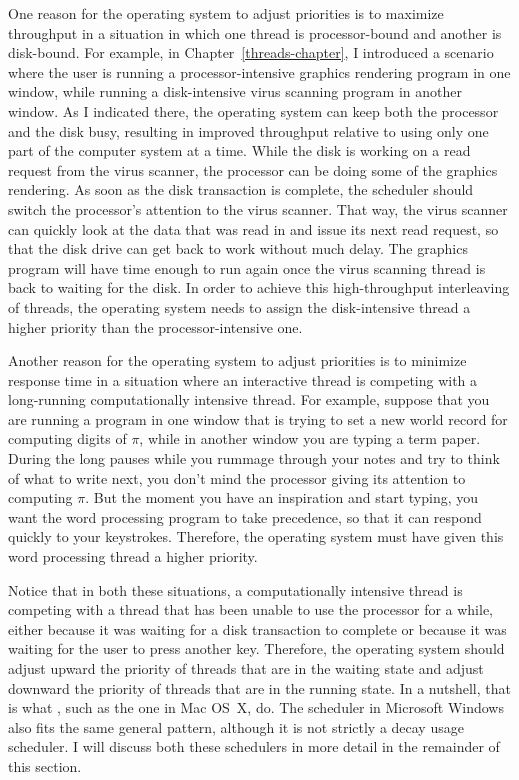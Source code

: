 One reason for the operating system to adjust priorities is to
maximize throughput in a situation in which one thread is
processor-bound and another is disk-bound.  For example, in
Chapter~\ref{threads-chapter}, I introduced a scenario where the user is running a
processor-intensive graphics rendering program in one window, while
running a disk-intensive virus scanning program in another window.  As
I indicated there, the operating system can keep both the processor
and the disk busy, resulting in improved throughput relative to using
only one part of the computer system at a time.  While the disk is
working on a read request from the virus scanner, the processor can be
doing some of the graphics rendering.  As soon as the disk transaction
is complete, the scheduler should switch the processor's attention to
the virus scanner.  That way, the virus scanner can quickly look at
the data that was read in and issue its next read request, so that the
disk drive can get back to work without much delay.  The graphics
program will have time enough to run again once the virus scanning
thread is back to waiting for the disk.  In order to achieve this
high-throughput interleaving of threads, the operating system needs to
assign the disk-intensive thread a higher priority than the
processor-intensive one.

Another reason for the operating system to adjust priorities is to
minimize response time in a situation where an interactive thread is
competing with a long-running computationally intensive thread.  For
example, suppose that you are running a program in one window that is
trying to set a new world record for computing digits of $\pi$, while in
another window you are typing a term paper.  During the long pauses
while you rummage through your notes and try to think of what to write
next, you don't mind the processor giving its attention to computing
$\pi$.  But the moment you have an inspiration and start typing, you want
the word processing program to take precedence, so that it can respond
quickly to your keystrokes.  Therefore, the operating system must have
given this word processing thread a higher priority.

Notice that in both these situations, a computationally intensive
thread is competing with a thread that has been unable to use the
processor for a while, either because it was waiting for a disk
transaction to complete or because it was waiting for the user to
press another key.  Therefore, the operating system should adjust
upward the priority of threads that are in the waiting state and
adjust downward the priority of threads that are in the running state.  In a
nutshell, that is what , such as the one in Mac
OS~X, do.  The scheduler in Microsoft Windows also fits the same
general pattern, although it is not strictly a  decay usage
scheduler.  I will discuss both these schedulers in more detail in the
remainder of this section.

